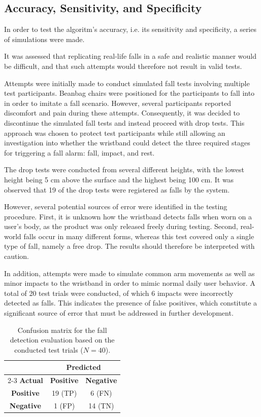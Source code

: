 \subsection{Accuracy, Sensitivity, and Specificity}
In order to test the algoritm's accuracy, i.e. its sensitivity and specificity, a series of simulations were made. 

It was assessed that replicating real-life falls in a safe and realistic manner would be difficult, and that such attempts would therefore not result in valid tests. 

Attempts were initially made to conduct simulated fall tests involving multiple test participants. Beanbag chairs were positioned for the participants to fall into in order to imitate a fall scenario. However, several participants reported discomfort and pain during these attempts. Consequently, it was decided to discontinue the simulated fall tests and instead proceed with drop tests. This approach was chosen to protect test participants while still allowing an investigation into whether the wristband could detect the three required stages for triggering a fall alarm: fall, impact, and rest.

The drop tests were conducted from several different heights, with the lowest height being 5 cm above the surface and the highest being 100 cm. It was observed that 19 of the drop tests were registered as falls by the system.

However, several potential sources of error were identified in the testing procedure. First, it is unknown how the wristband detects falls when worn on a user’s body, as the product was only released freely during testing. Second, real-world falls occur in many different forms, whereas this test covered only a single type of fall, namely a free drop. The results should therefore be interpreted with caution.

In addition, attempts were made to simulate common arm movements as well as minor impacts to the wristband in order to mimic normal daily user behavior. A total of 20 test trials were conducted, of which 6 impacts were incorrectly detected as falls. This indicates the presence of false positives, which constitute a significant source of error that must be addressed in further development.

\begin{table}[H]
    \centering
    \renewcommand{\arraystretch}{1.2}
    \begin{tabular}{c|cc}
        \multicolumn{1}{c}{} & \multicolumn{2}{c}{\textbf{Predicted}} \\
        \cline{2-3}
        \textbf{Actual} & \textbf{Positive} & \textbf{Negative} \\
        \hline
        \textbf{Positive} & 19 (TP) & 6 (FN) \\
        \textbf{Negative} & 1 (FP)  & 14 (TN) \\
    \end{tabular}
    \caption{Confusion matrix for the fall detection evaluation based on the conducted test trials ($N=40$).}
    \label{tab:confusion_matrix}
\end{table}

